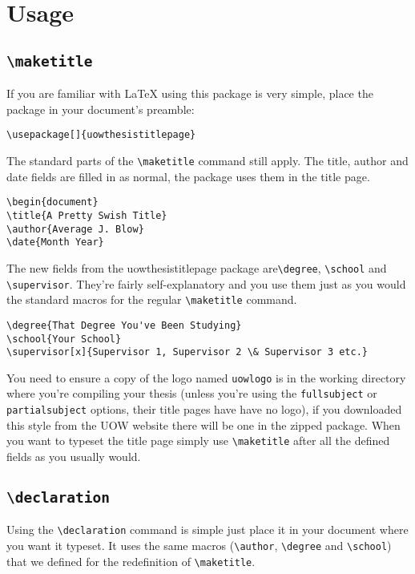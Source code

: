 \documentclass[12pt,oneside]{article}
\newcommand{\oporcom}[1]{\texttt{\color{RoyalBlue}#1}} %
\begin{document}
\section{Usage}
\subsection*{\oporcom{\textbackslash{}maketitle}}
If you are familiar with LaTeX using this package is very simple, place the package in your document's preamble:
\begin{verbatim}
\usepackage[]{uowthesistitlepage} 
\end{verbatim}
The standard parts of the \oporcom{\textbackslash{}maketitle} command still apply. The title, author and date fields are filled in as normal, the package uses them in the title page.
\begin{verbatim}
\begin{document}
\title{A Pretty Swish Title} 
\author{Average J. Blow}
\date{Month Year}
\end{verbatim}
The new fields from the uowthesistitlepage package are\oporcom{\textbackslash{}degree}, \oporcom{\textbackslash{}school} and \oporcom{\textbackslash{}supervisor}. They're fairly self-explanatory and you use them just as you would the standard macros for the regular \oporcom{\textbackslash{}maketitle} command.  
\begin{verbatim}
\degree{That Degree You've Been Studying} 
\school{Your School} 
\supervisor[x]{Supervisor 1, Supervisor 2 \& Supervisor 3 etc.}
\end{verbatim}
You need to ensure a copy of the logo named \texttt{uow\textunderscore{}logo} is in the working directory where you're compiling your thesis (unless you're using the \oporcom{fullsubject} or \oporcom{partialsubject} options, their title pages have have no logo), if you downloaded this style from the UOW website there will be one in the zipped package. When you want to typeset the title page simply use \oporcom{\textbackslash{}maketitle} after all the defined fields as you usually would.

\subsection*{\oporcom{\textbackslash{}declaration}}
Using the \oporcom{\textbackslash{}declaration} command is simple just place it in your document where you want it typeset. It uses the same macros (\oporcom{\textbackslash{}author}, \oporcom{\textbackslash{}degree} and \oporcom{\textbackslash{}school}) that we defined for the redefinition of \oporcom{\textbackslash{}maketitle}. 
\end{document}
